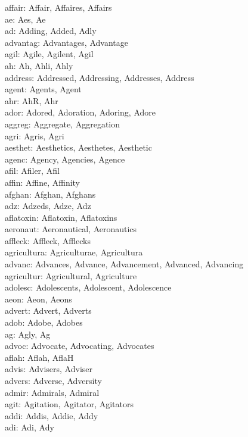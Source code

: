 \noindent
affair: Affair, Affaires, Affairs\\
ae: Aes, Ae\\
ad: Adding, Added, Adly\\
advantag: Advantages, Advantage\\
agil: Agile, Agilent, Agil\\
ah: Ah, Ahli, Ahly\\
address: Addressed, Addressing, Addresses, Address\\
agent: Agents, Agent\\
ahr: AhR, Ahr\\
ador: Adored, Adoration, Adoring, Adore\\
aggreg: Aggregate, Aggregation\\
agri: Agris, Agri\\
aesthet: Aesthetics, Aesthetes, Aesthetic\\
agenc: Agency, Agencies, Agence\\
afil: Afiler, Afil\\
affin: Affine, Affinity\\
afghan: Afghan, Afghans\\
adz: Adzeds, Adze, Adz\\
aflatoxin: Aflatoxin, Aflatoxins\\
aeronaut: Aeronautical, Aeronautics\\
affleck: Affleck, Afflecks\\
agricultura: Agriculturae, Agricultura\\
advanc: Advances, Advance, Advancement, Advanced, Advancing\\
agricultur: Agricultural, Agriculture\\
adolesc: Adolescents, Adolescent, Adolescence\\
aeon: Aeon, Aeons\\
advert: Advert, Adverts\\
adob: Adobe, Adobes\\
ag: Agly, Ag\\
advoc: Advocate, Advocating, Advocates\\
aflah: Aflah, AflaH\\
advis: Advisers, Adviser\\
advers: Adverse, Adversity\\
admir: Admirals, Admiral\\
agit: Agitation, Agitator, Agitators\\
addi: Addis, Addie, Addy\\
adi: Adi, Ady\\

